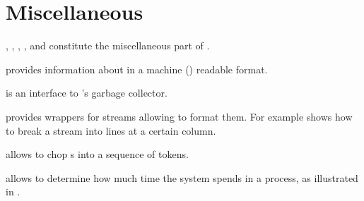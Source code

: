 %                                                                        
%                                                                        
%                                                                        
%                                                                        
%
\clearpage
\section{Miscellaneous}

,
,
,
, and
constitute the miscellaneous part of \projectname.

 provides information about \projectname in a machine (\Aldor) readable format.

 is an interface to \Aldor's garbage collector.

 provides wrappers for streams allowing to format them. For example  shows how to break a stream into lines at a certain column.


 allows to chop s into a sequence of tokens.


 allows to determine how much time the system spends in a process, as illustrated in .

\clearpage
{}

